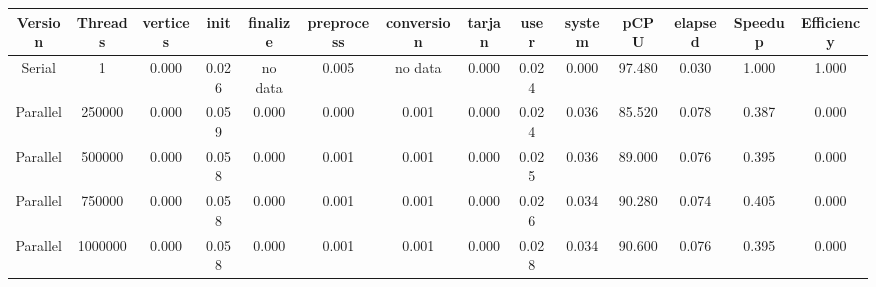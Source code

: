\begin{tabular}{|c|c|c|c|c|c|c|c|c|c|c|c|c|c|}
\toprule
 Version &  Threads &  vertices &  init & finalize &  preprocess & conversion &  tarjan &  user &  system &   pCPU &  elapsed &  Speedup &  Efficiency \\
\midrule
  Serial &        1 &  0.000 & 0.026 &  no data &       0.005 &    no data &   0.000 & 0.024 &   0.000 & 97.480 &    0.030 &    1.000 &       1.000 \\
Parallel &   250000 &  0.000 & 0.059 &    0.000 &       0.000 &      0.001 &   0.000 & 0.024 &   0.036 & 85.520 &    0.078 &    0.387 &       0.000 \\
Parallel &   500000 &  0.000 & 0.058 &    0.000 &       0.001 &      0.001 &   0.000 & 0.025 &   0.036 & 89.000 &    0.076 &    0.395 &       0.000 \\
Parallel &   750000 &  0.000 & 0.058 &    0.000 &       0.001 &      0.001 &   0.000 & 0.026 &   0.034 & 90.280 &    0.074 &    0.405 &       0.000 \\
Parallel &  1000000 &  0.000 & 0.058 &    0.000 &       0.001 &      0.001 &   0.000 & 0.028 &   0.034 & 90.600 &    0.076 &    0.395 &       0.000 \\
\bottomrule
\end{tabular}
